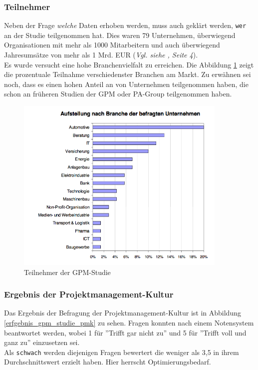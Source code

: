 \documentclass[11pt]{scrartcl}
\begin{document}
\subsubsection{Teilnehmer}

Neben der Frage \textit{welche} Daten erhoben werden, muss auch geklärt werden, \texttt{wer} an der Studie teilgenommen hat. Dies waren 79 Unternehmen, überwiegend Organisationen mit mehr als 1000 Mitarbeitern und auch überwiegend Jahresumsätze von mehr als 1 Mrd. EUR (\textit{Vgl. siehe \cite{GPM_Studie_2008}, Seite 4}).\\
Es wurde versucht eine hohe Branchenvielfalt zu erreichen. Die Abbildung \ref{teilnehmer_gpm_studie} zeigt die prozentuale Teilnahme verschiedenster Branchen am Markt. Zu erwähnen sei noch, dass es einen hohen Anteil an von Unternehmen teilgenommen haben, die schon an früheren Studien der GPM oder PA-Group teilgenommen haben. 

\begin{figure}[H]
	\begin{center}
		\includegraphics[width=0.9\textwidth]{img/teilnehmer_gpm_studie}
		\caption{Teilnehmer der GPM-Studie}
		\label{teilnehmer_gpm_studie}	
	\end{center}
\end{figure}

\subsubsection{Ergebnis der Projektmanagement-Kultur}
\label{ergebnis_pmk}
Das Ergebnis der Befragung der Projektmanagement-Kultur ist in Abbildung \ref{erfgebnis_gpm_studie_pmk} zu sehen. Fragen konnten nach einem Notensystem beantwortet werden, wobei 1 für ''Trifft gar nicht zu'' und 5 für ''Trifft voll und ganz zu'' einzusetzen sei. \\
Als \texttt{schwach} werden diejenigen Fragen bewertert die weniger als 3,5 in ihrem Durchschnittswert erzielt haben. Hier herrscht Optimierungsbedarf. 
\end{document}

